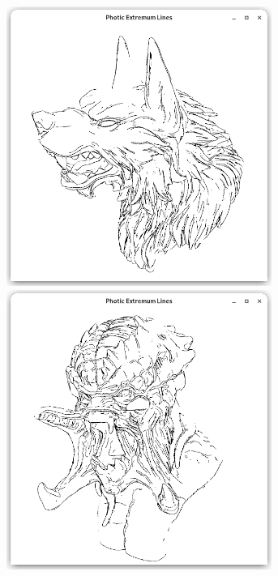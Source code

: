 \documentclass[9pt,fleqn,twoside,twocolumn]{stdglobal}
\begin{document}
\begin{figure}
\begin{subfigure}[t]{0.19\textwidth}
        \includegraphics[width=0.95\textwidth,trim={15px 15 15 50},clip]{images/results/werewolf-pel.png}
        \includegraphics[width=0.95\textwidth,trim={15px 15 15 50},clip]{images/results/predator-pel.png}

\end{subfigure}
\end{figure}
\end{document}
